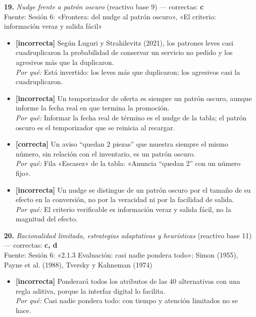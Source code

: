 \documentclass[10pt,letterpaper]{article}
\begin{document}
{\begin{itemize}[leftmargin=1.2em,itemsep=0pt,topsep=1pt,parsep=0pt]
\end{itemize}
\vspace{3pt}\noindent\textbf{19.} \textit{Nudge frente a patrón oscuro} (reactivo base 9) — correctas: \textbf{c}\\[-1pt]
{\scriptsize Fuente: Sesión 6: «Frontera: del nudge al patrón oscuro», «El criterio: información veraz y salida fácil»}
\begin{itemize}[leftmargin=1.2em,itemsep=0pt,topsep=1pt,parsep=0pt]
\item[\textbf{a)}] {\footnotesize \textbf{[incorrecta]} Según Luguri y Strahilevitz (2021), los patrones leves casi cuadruplicaron la probabilidad de conservar un servicio no pedido y los agresivos más que la duplicaron.\\ \textit{Por qué:} Está invertido: los leves más que duplicaron; los agresivos casi la cuadruplicaron.}
\item[\textbf{b)}] {\footnotesize \textbf{[incorrecta]} Un temporizador de oferta es siempre un patrón oscuro, aunque informe la fecha real en que termina la promoción.\\ \textit{Por qué:} Informar la fecha real de término es el nudge de la tabla; el patrón oscuro es el temporizador que se reinicia al recargar.}
\item[\textbf{c)}] {\footnotesize \textbf{[correcta]} Un aviso \enquote{quedan 2 piezas} que muestra siempre el mismo número, sin relación con el inventario, es un patrón oscuro.\\ \textit{Por qué:} Fila «Escasez» de la tabla: «Anuncia \enquote{quedan 2} con un número fijo».}
\item[\textbf{d)}] {\footnotesize \textbf{[incorrecta]} Un nudge se distingue de un patrón oscuro por el tamaño de su efecto en la conversión, no por la veracidad ni por la facilidad de salida.\\ \textit{Por qué:} El criterio verificable es información veraz y salida fácil, no la magnitud del efecto.}
\end{itemize}
\vspace{3pt}\noindent\textbf{20.} \textit{Racionalidad limitada, estrategias adaptativas y heurísticas} (reactivo base 11) — correctas: \textbf{c, d}\\[-1pt]
{\scriptsize Fuente: Sesión 6: «2.1.3 Evaluación: casi nadie pondera todo»; Simon (1955), Payne et al. (1988), Tversky y Kahneman (1974)}
\begin{itemize}[leftmargin=1.2em,itemsep=0pt,topsep=1pt,parsep=0pt]
\item[\textbf{a)}] {\footnotesize \textbf{[incorrecta]} Ponderará todos los atributos de las 40 alternativas con una regla aditiva, porque la interfaz digital lo facilita.\\ \textit{Por qué:} Casi nadie pondera todo: con tiempo y atención limitados no se hace.}

\end{itemize}}
\end{document}
